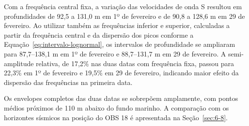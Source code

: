 Com a frequência central fixa, a variação das velocidades de onda S resultou em profundidades de 92,5 a 131,0 m em 1º de fevereiro e de 90,8 a 128,6 m em 29 de fevereiro. Ao utilizar também as frequências inferior e superior, calculadas a partir da frequência central e da dispersão dos picos conforme a Equação~\eqref{eq:intervalo-lognormal}, os intervalos de profundidade se ampliaram para 87,7--138,1 m em 1º de fevereiro e 88,7--131,7 m em 29 de fevereiro. A semi-amplitude relativa, de 17,2\% nas duas datas com frequência fixa, passou para 22,3\% em 1º de fevereiro e 19,5\% em 29 de fevereiro, indicando maior efeito da dispersão das frequências na primeira data.

Os envelopes completos das duas datas se sobrepõem amplamente, com pontos médios próximos de 110 m abaixo do fundo marinho. A comparação com os horizontes sísmicos na posição do OBS 18 é apresentada na Seção~\ref{sec:6-8}.
